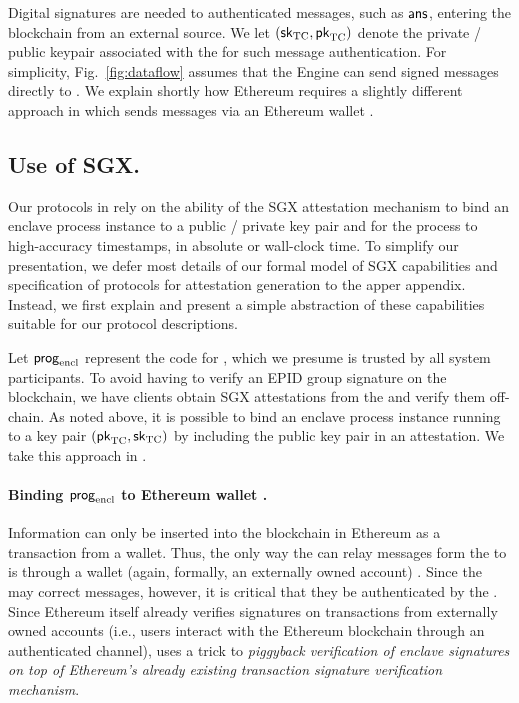 Digital signatures are needed to authenticated messages, such as ${\sf ans}$, entering the blockchain from an external source. We let $({\sf sk}_{\textrm{TC}}, {\sf pk}_{\textrm{TC}})$ denote the private / public keypair associated with the \encname for such message authentication. For simplicity, Fig.~\ref{fig:dataflow} assumes that the Engine can send signed messages directly to \tcont. We explain shortly how Ethereum requires a slightly different approach in which \tc sends messages via an Ethereum wallet \tcadd.


\subsection{Use of SGX.}
Our protocols in \tc rely on the ability of the SGX attestation mechanism to bind an enclave process instance to a public / private key pair and for the process to high-accuracy timestamps, in absolute or wall-clock time. To simplify our presentation, we defer most details of our formal model of SGX capabilities and specification of protocols for attestation generation to the apper appendix. Instead, we first explain and present a simple abstraction of these capabilities suitable for our \tc protocol descriptions. 

Let ${\sf prog}_{\textrm{encl}}$ represent the code for \encname, which we presume is trusted by all system participants. To avoid having to verify an EPID group signature on the blockchain, we have clients obtain SGX attestations from the \medname and verify them off-chain. As noted above, it is possible to bind an enclave process instance running \enclaveprog to a key pair $({\sf pk}_{\textrm{TC}}, {\sf sk}_{\textrm{TC}})$ by including the public key pair in an attestation. We take this approach in \tc. 

\paragraph{Binding ${\sf prog}_{\textrm{encl}}$ to Ethereum wallet \tcadd.}
Information can only be inserted into the blockchain in Ethereum as a transaction from a wallet. Thus, the only way the \medname can relay messages form the \encname to \tcont is through a wallet (again, formally, an externally owned account) \tcadd. Since the \medname may correct messages, however, it is critical that they be authenticated by the \encname. Since Ethereum itself 
already verifies signatures on transactions from externally owned accounts (i.e., users interact with the  Ethereum blockchain through an authenticated channel), \tc uses a trick to {\it piggyback verification of enclave signatures on top of Ethereum's already existing transaction signature verification mechanism}. 

